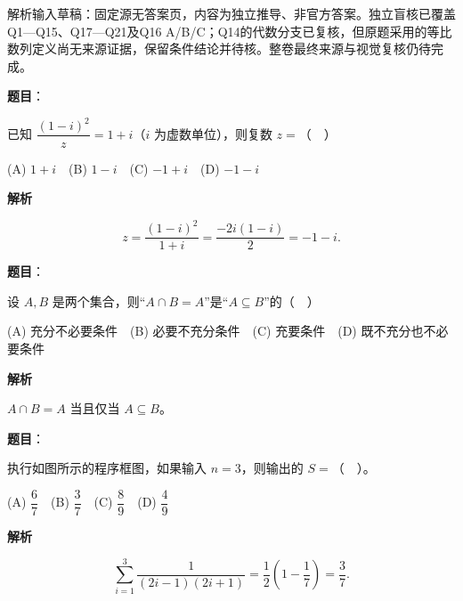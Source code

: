 
\begin{gktip}
解析输入草稿：固定源无答案页，内容为独立推导、非官方答案。独立盲核已覆盖Q1—Q15、Q17—Q21及Q16 A/B/C；Q14的代数分支已复核，但原题采用的等比数列定义尚无来源证据，保留条件结论并待核。整卷最终来源与视觉复核仍待完成。
\end{gktip}


\begin{answer}

\textbf{题目}：

已知 \(\dfrac{(1-i)^2}{z}=1+i\)（\(i\) 为虚数单位），则复数 \(z=\)（　）

(A) \(1+i\)　(B) \(1-i\)　(C) \(-1+i\)　(D) \(-1-i\)

\textbf{解析}

\nopagebreak[4]
\[
z=\frac{(1-i)^2}{1+i}=\frac{-2i(1-i)}2=-1-i.
\]


\end{answer}
\begin{answer}

\textbf{题目}：

设 \(A,B\) 是两个集合，则“\(A\cap B=A\)”是“\(A\subseteq B\)”的（　）

(A) 充分不必要条件　(B) 必要不充分条件　(C) 充要条件　(D) 既不充分也不必要条件

\textbf{解析}

\(A\cap B=A\) 当且仅当 \(A\subseteq B\)。


\end{answer}
\begin{answer}

\textbf{题目}：

执行如图所示的程序框图，如果输入 \(n=3\)，则输出的 \(S=\)（　）。
\nopagebreak[4]
\begin{center}\end{center}
\nopagebreak[4]
(A) \(\dfrac67\)　(B) \(\dfrac37\)　(C) \(\dfrac89\)　(D) \(\dfrac49\)

\textbf{解析}

\nopagebreak[4]
\[
\sum_{i=1}^3\frac1{(2i-1)(2i+1)}
=\frac12\left(1-\frac17\right)=\frac37.
\]


\end{answer}
